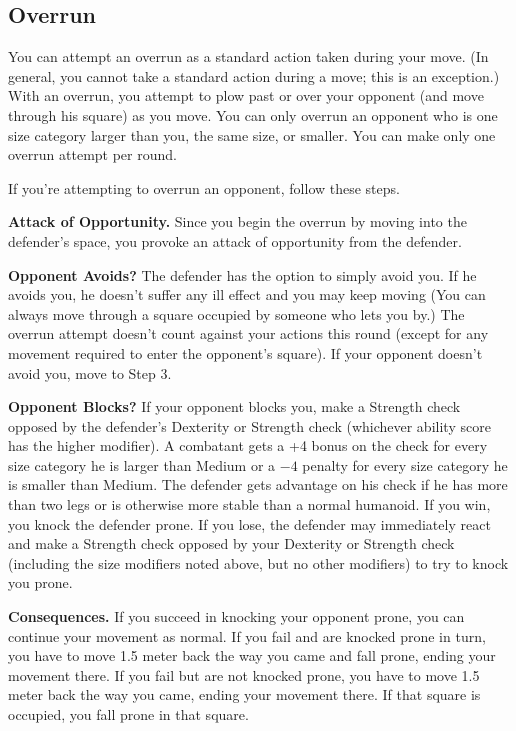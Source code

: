 \subsection{Overrun}
You can attempt an overrun as a standard action taken during your move. (In general, you cannot take a standard action during a move; this is an exception.) With an overrun, you attempt to plow past or over your opponent (and move through his square) as you move. You can only overrun an opponent who is one size category larger than you, the same size, or smaller. You can make only one overrun attempt per round.

If you're attempting to overrun an opponent, follow these steps.

\begin{enumerate*}
\item \textbf{Attack of Opportunity.} Since you begin the overrun by moving into the defender's space, you provoke an attack of opportunity from the defender.

\item \textbf{Opponent Avoids?} The defender has the option to simply avoid you. If he avoids you, he doesn't suffer any ill effect and you may keep moving (You can always move through a square occupied by someone who lets you by.) The overrun attempt doesn't count against your actions this round (except for any movement required to enter the opponent's square). If your opponent doesn't avoid you, move to Step 3.

\item \textbf{Opponent Blocks?} If your opponent blocks you, make a Strength check opposed by the defender's Dexterity or Strength check (whichever ability score has the higher modifier). A combatant gets a +4 bonus on the check for every size category he is larger than Medium or a $-4$ penalty for every size category he is smaller than Medium. The defender gets advantage on his check if he has more than two legs or is otherwise more stable than a normal humanoid. If you win, you knock the defender prone. If you lose, the defender may immediately react and make a Strength check opposed by your Dexterity or Strength check (including the size modifiers noted above, but no other modifiers) to try to knock you prone.

\item \textbf{Consequences.} If you succeed in knocking your opponent prone, you can continue your movement as normal. If you fail and are knocked prone in turn, you have to move 1.5 meter back the way you came and fall prone, ending your movement there. If you fail but are not knocked prone, you have to move 1.5 meter back the way you came, ending your movement there. If that square is occupied, you fall prone in that square.
\end{enumerate*}

